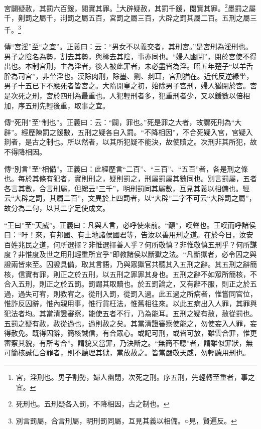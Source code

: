 宮闢疑赦，其罰六百鍰，閱實其罪。\footnote{宮，淫刑也。男子割勢，婦人幽閉，次死之刑。序五刑，先輕轉至重者，事之宜。}大辟疑赦，其罰千鍰，閱實其罪。\footnote{死刑也。五刑疑各入罰，不降相因，古之制也。}墨罰之屬千，劓罰之屬千，剕罰之屬五百，宮罰之屬三百，大辟之罰其屬二百。五刑之屬三千。\footnote{別言罰屬，合言刑屬，明刑罰同屬，互見其義以相備。○見，賢遍反。}

{\noindent\zhuan{}\fzbyks 傳“宮淫”至“之宜”。正義曰：云：“男女不以義交者，其刑宮。”是宮刑為淫刑也。男子之陰名為勢，割去其勢，與椓去其陰，事亦同也。“婦人幽閉”，閉於宮使不得出也。本制宮刑，主為淫者，後人被此罪者，未必盡皆為淫。昭五年楚子“以羊舌肸為司宮”，非坐淫也。漢除肉刑，除墨、劓、剕耳，宮刑猶在。近代反逆緣坐，男子十五已下不應死者皆宮之。大隋開皇之初，始除男子宮刑，婦人猶閉於宮。宮是次死之刑，宮於四刑為最重也。人犯輕刑者多，犯重刑者少，又以鍰數以倍相加，序五刑先輕後重，取事之宜。 \par}

{\noindent\zhuan{}\fzbyks 傳“死刑”至“制也”。正義曰：云：“闢，罪也。”死是罪之大者，故謂死刑為“大辟”。經歷陳罰之鍰數，五刑之疑各自入罰。“不降相因”，不合死疑入宮，宮疑入剕者，是古之制也。所以然者，以其所犯疑不能決，故使贖之。次刑非其所犯，故不得降相因。 \par}

{\noindent\zhuan{}\fzbyks 傳“別言”至“相備”。正義曰：此經歷言“二百”、“三百”、“五百”者，各是刑之條也。每於其條有犯者，實則刑之，疑則罰之，刑屬罰屬其數同也。別言罰屬，五者各言其數，合言刑屬，但總云“三千”，明刑罰同其屬數，互見其義以相備也。經云“大辟之罰，其屬二百”，文異於上四罰者，以“大辟”二字不可云“大辟罰之屬”，故分為二句，以其二字足使成文。 \par}

{\noindent\shu{}\fzkt “王曰”至“天威”。正義曰：凡與人言，必呼使來前。“籲”，嘆聲也。王嘆而呼諸侯曰：“吁！來，有邦國、有土地諸侯國君等，告汝以善用刑之道。在於今日，汝安百姓兆民之道，何所選擇？非惟選擇善人乎？何所敬慎？非惟敬慎五刑乎？何所謀度？非惟度及世之用刑輕重所宜乎”即教諸侯以斷獄之法。“凡斷獄者，必令囚之與證兩皆來至。囚證具備，取其言語，乃與眾獄官共聽其入五刑之辭。其五刑之辭簡核，信實有罪，則正之於五刑，以五刑之罪罪其身也。五刑之辭不如眾所簡核，不合入五刑，則正之於五罰。罰謂其取贖也。於五罰論之，又有辭不服，則正之於五過，過失可宥，則教宥之。從刑入罰，從罰入過。此五過之所病者，惟嘗同官位，惟詐反囚辭，惟內親用事，惟行貨枉法，惟舊相往來。以此五病出入人罪，其罪與犯法者均。其當清證審察，能使五者不行，乃為能耳。五刑之疑有赦，赦從罰也。五罰之疑有赦，赦從過也，過則赦之矣。其當清證審察使能之，勿使妄入人罪，妄得赦免。既得囚辭，簡核誠信，有合眾心。或記可刑，或皆可放，雖雲合罪，惟更審察其貌，有所考合”。謂貌又當罪，乃決斷之。“無簡不聽”者，謂雖似罪狀，無可簡核誠信合罪者，則不聽理其獄，當放赦之。皆當嚴敬天威，勿輕聽用刑也。 \par}

